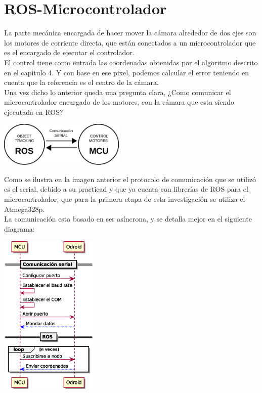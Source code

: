 \section{ROS-Microcontrolador}
La parte mecánica encargada de hacer mover la cámara alrededor de dos ejes son los motores de corriente directa, que están conectados
a un microcontrolador que es el encargado de ejecutar el controlador.\\
El control tiene como entrada las coordenadas obtenidas por el algoritmo descrito en el capitulo 4. Y con base en ese pixel, podemos
calcular el error teniendo en cuenta que la referencia es el centro de la cámara.\\
Una vez dicho lo anterior queda una pregunta clara, ¿Como comunicar el microcontrolador encargado de los motores, con la cámara que
esta siendo ejecutada en ROS?
\begin{center}
	\includegraphics[width=0.45\textwidth]{Contenido/Cuerpo/Capitulo5/Fig1.eps}
	\label{Fig2}
\end{center}
Como se ilustra en la imagen anterior el protocolo de comunicación que se utilizó es el serial, debido a su practicad y que ya
cuenta con librerías de ROS para el microcontrolador, que para la primera etapa de esta investigación se utiliza el Atmega328p.\\
La comunicación esta basado en ser asíncrona, y se detalla mejor en el siguiente diagrama:
\begin{center}
	\includegraphics[width=0.35\textwidth]{Contenido/Cuerpo/Capitulo5/Fig2.eps}
	\label{Fig3}
\end{center}
